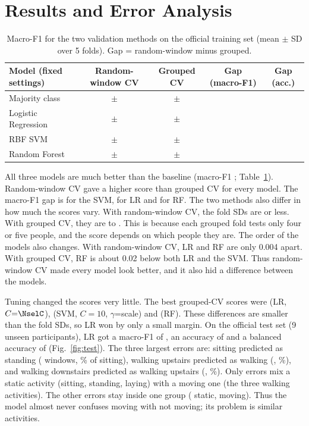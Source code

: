 \documentclass{article}
\begin{document}
\section{Results and Error Analysis}
\begin{table}[t]
\centering
\caption{Macro-F1 for the two validation methods on the official training set (mean $\pm$ SD over 5 folds). Gap = random-window minus grouped.}
\label{tab:main}
\small
\begin{tabular}{lcccc}
\toprule
Model (fixed settings) & Random-window CV & Grouped CV & Gap (macro-F1) & Gap (acc.) \\
\midrule
Majority class & \NrandDummy{} $\pm$ \NrandsdDummy{} & \NgrpDummy{} $\pm$ \NgrpsdDummy{} & \NgapDummy{} & \NgapaccDummy{} \\
Logistic Regression & \NrandLR{} $\pm$ \NrandsdLR{} & \NgrpLR{} $\pm$ \NgrpsdLR{} & \NgapLR{} & \NgapaccLR{} \\
RBF SVM & \NrandSVM{} $\pm$ \NrandsdSVM{} & \NgrpSVM{} $\pm$ \NgrpsdSVM{} & \NgapSVM{} & \NgapaccSVM{} \\
Random Forest & \NrandRF{} $\pm$ \NrandsdRF{} & \NgrpRF{} $\pm$ \NgrpsdRF{} & \NgapRF{} & \NgapaccRF{} \\
\bottomrule
\end{tabular}
\end{table}

All three models are much better than the baseline (macro-F1 \NgrpDummy{}; Table~\ref{tab:main}). Random-window CV gave a higher score than grouped CV for every model. The macro-F1 gap is \NgapSVM{} for the SVM, \NgapLR{} for LR and \NgapRF{} for RF. The two methods also differ in how much the scores vary. With random-window CV, the fold SDs are \Nrandsdmax{} or less. With grouped CV, they are \Ngrpsdmin{} to \Ngrpsdmax{}. This is because each grouped fold tests only four or five people, and the score depends on which people they are. The order of the models also changes. With random-window CV, LR and RF are only 0.004 apart. With grouped CV, RF is about 0.02 below both LR and the SVM. Thus random-window CV made every model look better, and it also hid a difference between the models.

Tuning changed the scores very little. The best grouped-CV scores were \NtuneLR{} (LR, $C{=}\NselC$), \NtuneSVM{} (SVM, $C{=}10$, $\gamma$=scale) and \NtuneRF{} (RF). These differences are smaller than the fold SDs, so LR won by only a small margin. On the official test set (9 unseen participants), LR got a macro-F1 of \Ntestf{}, an accuracy of \Ntestacc{} and a balanced accuracy of \Ntestbal{} (Fig.~\ref{fig:test}). The three largest errors are: sitting predicted as standing (\NconfAn{} windows, \NconfApct\% of sitting), walking upstairs predicted as walking (\NconfBn{}, \NconfBpct\%), and walking downstairs predicted as walking upstairs (\NconfCn{}, \NconfCpct\%). Only \Nncross{} errors mix a static activity (sitting, standing, laying) with a moving one (the three walking activities). The other errors stay inside one group (\Nnwithinstatic{} static, \Nnwithindyn{} moving). Thus the model almost never confuses moving with not moving; its problem is similar activities.
\end{document}
